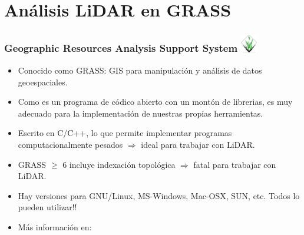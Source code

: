 \section{Análisis LiDAR en GRASS}
\begin{frame}
 \frametitle{Geographic Resources Analysis Support System\hfill 
   \includegraphics[width=0.7cm]{images/grasslogo_transp_big.png}} 
 \begin{itemize}
    \item Conocido como \alert<1>{GRASS}: GIS para manipulación y 
      análisis de datos geoespaciales.
    \item Como es un programa de \alert{códico abierto} con un 
      montón de librerias, es muy adecuado para la implementación 
      de nuestras propias herramientas.
    \item Escrito en C/C++, lo que permite implementar programas 
      computacionalmente pesados $\Rightarrow$ \alert{ideal} 
      para trabajar con LiDAR.
    \item GRASS $\geq$ 6 incluye indexación topológica $\Rightarrow$ 
      \alert{fatal} para trabajar con LiDAR.
    \item Hay versiones para GNU/Linux, MS-Windows, Mac-OSX, SUN, etc. 
      \alert{\textexclamdown\textexclamdown Todos lo pueden utilizar!!}
    \item Más información en:  
  \end{itemize}
\end{frame}
